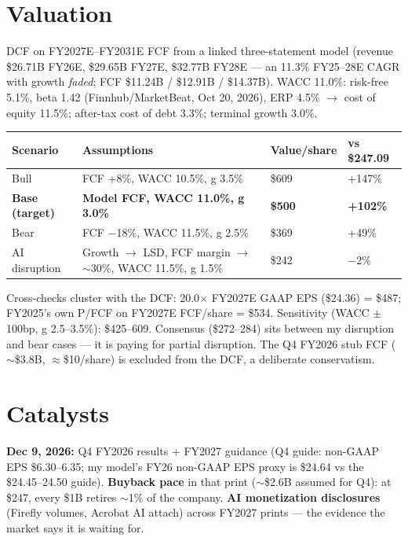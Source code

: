 \documentclass[9pt]{extarticle}
\begin{document}
\section*{Valuation}
DCF on FY2027E--FY2031E FCF from a linked three-statement model (revenue \$26.71B FY26E, \$29.65B FY27E, \$32.77B FY28E --- an 11.3\% FY25--28E CAGR with growth \emph{faded}; FCF \$11.24B / \$12.91B / \$14.37B). WACC 11.0\%: risk-free 5.1\%, beta 1.42 (Finnhub/MarketBeat, Oct 20, 2026), ERP 4.5\% $\rightarrow$ cost of equity 11.5\%; after-tax cost of debt 3.3\%; terminal growth 3.0\%.
\begin{center}\vspace{2pt}
\begin{tabular}{@{}llll@{}}
\toprule
\textbf{Scenario} & \textbf{Assumptions} & \textbf{Value/share} & \textbf{vs \$247.09} \\
\midrule
Bull & FCF +8\%, WACC 10.5\%, g 3.5\% & \$609 & +147\% \\
\textbf{Base (target)} & \textbf{Model FCF, WACC 11.0\%, g 3.0\%} & \textbf{\$500} & \textbf{+102\%} \\
Bear & FCF $-$18\%, WACC 11.5\%, g 2.5\% & \$369 & +49\% \\
AI disruption & Growth $\rightarrow$ LSD, FCF margin $\rightarrow$ $\sim$30\%, WACC 11.5\%, g 1.5\% & \$242 & $-$2\% \\
\bottomrule
\end{tabular}
\end{center}
\vspace{1pt}
Cross-checks cluster with the DCF: 20.0$\times$ FY2027E GAAP EPS (\$24.36) = \$487; FY2025's own P/FCF on FY2027E FCF/share = \$534. Sensitivity (WACC $\pm$100bp, g 2.5--3.5\%): \$425--609. Consensus (\$272--284) sits between my disruption and bear cases --- it is paying for partial disruption. The Q4 FY2026 stub FCF ($\sim$\$3.8B, $\approx$\$10/share) is excluded from the DCF, a deliberate conservatism.

\section*{Catalysts}
\textbf{Dec 9, 2026:} Q4 FY2026 results + FY2027 guidance (Q4 guide: non-GAAP EPS \$6.30--6.35; my model's FY26 non-GAAP EPS proxy is \$24.64 vs the \$24.45--24.50 guide). \textbf{Buyback pace} in that print ($\sim$\$2.6B assumed for Q4): at \$247, every \$1B retires $\sim$1\% of the company. \textbf{AI monetization disclosures} (Firefly volumes, Acrobat AI attach) across FY2027 prints --- the evidence the market says it is waiting for.
\end{document}
